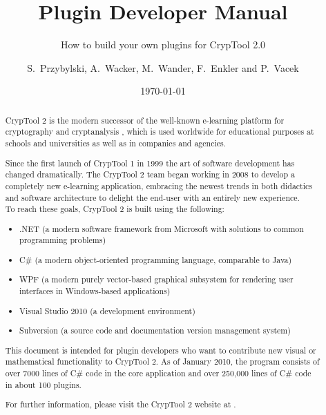 \documentclass[11pt, a4paper, titlepage]{scrreprt}
\title{Plugin Developer Manual}
\subtitle{How to build your own plugins for CrypTool 2.0}
\author{S.\ Przybylski, A.\ Wacker, M.\ Wander, F.\ Enkler and P.\ Vacek}
\date{\today}
\makeatletter
\newcommand\WaterMarkPic{%
    \setlength{\@tempdimb}{1.85cm}%
    \setlength{\@tempdimc}{2.7cm}%
    \setlength{\unitlength}{1pt}%
    \put(\strip@pt\@tempdimb,\strip@pt\@tempdimc){
            \texttt{[image: figures/ct\_logo\_watermark]}%
    }
}
\makeatother
\begin{document}
	\maketitle

	\begin{abstract}
CrypTool 2 is the modern successor of the well-known e-learning platform for cryptography and cryptanalysis , which is used worldwide for educational purposes at schools and universities as well as in companies and agencies.

Since the first launch of CrypTool 1 in 1999 the art of software development has changed dramatically. The CrypTool 2 team began working in 2008 to develop a completely new e-learning application, embracing the newest trends in both didactics and software architecture to delight the end-user with an entirely new experience.\\

To reach these goals, CrypTool 2 is built using the following:

\begin{itemize}
	\item .NET (a modern software framework from Microsoft with solutions to common programming problems)
	\item C\# (a modern object-oriented programming language, comparable to Java)
    \item WPF (a modern purely vector-based graphical subsystem for rendering user interfaces in Windows-based applications)
    \item Visual Studio 2010 (a development environment)
	\item Subversion (a source code and documentation version management system)
\end{itemize}

This document is intended for plugin developers who want to contribute new visual or mathematical functionality to CrypTool 2. As of January 2010, the program consists of over 7000 lines of C\# code in the core application and over 250,000 lines of C\# code in about 100 plugins.

For further information, please visit the CrypTool 2 website at .
    \end{abstract}

	\tableofcontents
    \listoffigures


	
	
\end{document}
